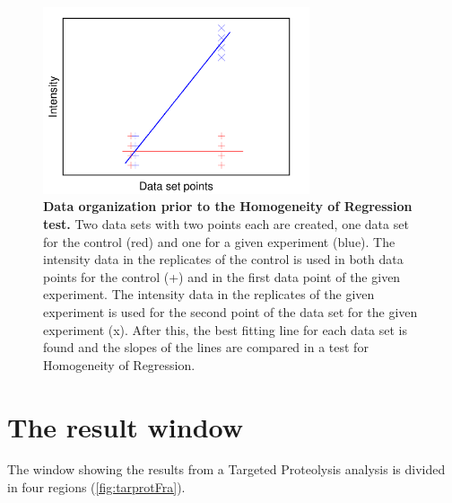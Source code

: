 \begin{figure}[h]
    \centering
    \includegraphics[width=0.7\textwidth]{./IMAGES/MOD-TARPROT/tarprot-ancova.png}	    
    \caption[Data organization prior to the Homogeneity of Regression test]{\textbf{Data
    organization prior to the Homogeneity of Regression test.} Two data sets with
    two points each are created, one data set for the control (red) and one for a
    given experiment (blue). The intensity data in the replicates of the control is
    used in both data points for the control (+) and in the first data point of the
    given experiment. The intensity data in the replicates of the given experiment
    is used for the second point of the data set for the given experiment (x). After
    this, the best fitting line for each data set is found and the slopes of the
    lines are compared in a test for Homogeneity of Regression.} 
    \label{fig:tarprotAncova}
    \vspace{-5pt} 	
\end{figure} 

\section{The result window}

The window showing the results from a Targeted Proteolysis analysis is divided in
four regions (\autoref{fig:tarprotFra}).

